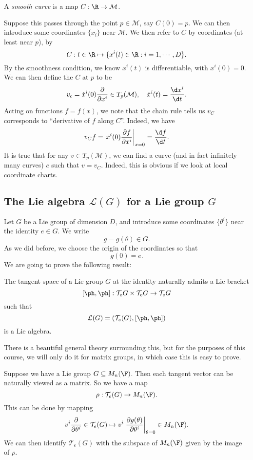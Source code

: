 \documentclass[a4paper]{article}
\begin{document}
\begin{defi}
  A \emph{smooth curve} is a map $C: \R \to \mathcal{M}$.
\end{defi}
Suppose this passes through the point $p \in \mathcal{M}$, say $C(0) = p$. We can then introduce some coordinates $\{x_i\}$ near $\mathcal{M}$. We then refer to $C$ by coordinates (at least near $p$), by
\[
  C: t \in \R \mapsto \{x^i(t) \in \R: i = 1, \cdots, D\}.
\]
By the smoothness condition, we know $x^i(t)$ is differentiable, with $x^i(0) = 0$. We can then define the  $C$ at $p$ to be
\[
  v_c = \dot{x}^i(0) \frac{\partial}{\partial x^i} \in T_p (\mathcal{M}),\quad \dot{x}^i(t) = \frac{\d x^i}{\d t}.
\]
Acting on functions $f = f(x)$, we note that the chain rule tells us $v_C$ corresponds to ``derivative of $f$ along $C$''. Indeed, we have
\[
  v_C f = \left.\dot{x}^i(0) \frac{\partial f}{\partial x^i} \right|_{x = 0} = \frac{\d f}{\d t}.
\]
It is true that for any $v \in T_p(\mathcal{M})$, we can find a curve (and in fact infinitely many curves) $c$ such that $v = v_C$. Indeed, this is obvious if we look at local coordinate charts.

\subsection{The Lie algebra \texorpdfstring{$\mathcal{L}(G)$}{L(G)} for a Lie group \texorpdfstring{$G$}{G}}
Let $G$ be a Lie group of dimension $D$, and introduce some coordinates $\{\theta^i\}$ near the identity $e \in G$. We write
\[
  g = g(\theta) \in G.
\]
As we did before, we choose the origin of the coordinates so that
\[
  g(0) = e.
\]
We are going to prove the following result:
\begin{thm}
  The tangent space of a Lie group $G$ at the identity naturally admits a Lie bracket
  \[
    [\ph, \ph]: \mathcal{T}_e G \times \mathcal{T}_e G \to \mathcal{T}_e G
  \]
  such that
  \[
    \mathcal{L}(G) = (\mathcal{T}_e(G), [\ph, \ph])
  \]
  is a Lie algebra.
\end{thm}
There is a beautiful general theory surrounding this, but for the purposes of this course, we will only do it for matrix groups, in which case this is easy to prove.

Suppose we have a Lie group $G \subseteq M_n(\F)$. Then each tangent vector can be naturally viewed as a matrix. So we have a map
\[
  \rho: \mathcal{T}_e(G) \to M_n(\F).
\]
This can be done by mapping
\[
  v^i \frac{\partial}{\partial \theta^i} \in \mathcal{T}_e (G) \mapsto v^i \left.\frac{\partial g(\theta)}{\partial \theta^i}\right|_{\theta = 0} \in M_n(\F).
\]
We can then identify $\mathcal{T}_e(G)$ with the subspace of $M_n(\F)$ given by the image of $\rho$.
\end{document}
